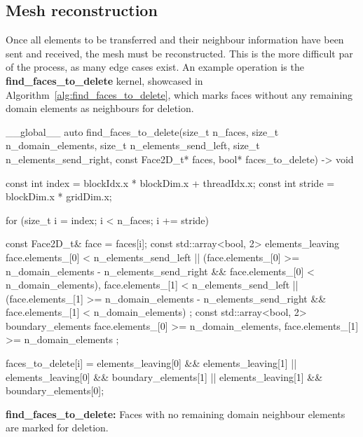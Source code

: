 \subsection{Mesh reconstruction}\label{subsection:load_balancing:implementation:reconstruction}

Once all elements to be transferred and their neighbour information have been sent and received, the
mesh must be reconstructed. This is the more difficult par of the process, as many edge cases exist.
An example operation is the \textbf{find\_faces\_to\_delete} kernel, showcased in
Algorithm~\ref{alg:find_faces_to_delete}, which marks faces without any remaining domain elements as
neighbours for deletion.

\begin{algorithm}[H]
    \begin{cuda}
        __global__
        auto find_faces_to_delete(size_t n_faces, size_t n_domain_elements, 
                size_t n_elements_send_left, size_t n_elements_send_right, 
                const Face2D_t* faces, bool* faces_to_delete) -> void {

            const int index = blockIdx.x * blockDim.x + threadIdx.x;
            const int stride = blockDim.x * gridDim.x;

            for (size_t i = index; i < n_faces; i += stride) {
                const Face2D_t& face = faces[i];
                const std::array<bool, 2> elements_leaving {
                    face.elements_[0] < n_elements_send_left 
                        || (face.elements_[0] >= n_domain_elements - n_elements_send_right 
                            && face.elements_[0] < n_domain_elements),
                    face.elements_[1] < n_elements_send_left 
                        || (face.elements_[1] >= n_domain_elements - n_elements_send_right 
                            && face.elements_[1] < n_domain_elements)
                };
                const std::array<bool, 2> boundary_elements {
                    face.elements_[0] >= n_domain_elements,
                    face.elements_[1] >= n_domain_elements
                };

                faces_to_delete[i] = elements_leaving[0] && elements_leaving[1] 
                                  || elements_leaving[0] && boundary_elements[1] 
                                  || elements_leaving[1] && boundary_elements[0];
            }
        }\end{cuda}
\caption{\textbf{find\_faces\_to\_delete:} Faces with no remaining domain neighbour elements are marked for deletion.}\label{alg:find_faces_to_delete}
\end{algorithm}

